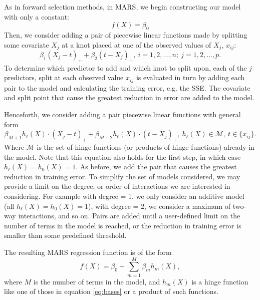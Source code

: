 \documentclass[12pt]{article}
\begin{document}
As in forward selection methods, in MARS, we begin constructing our model with only a constant:
\begin{equation}
  f(X) = \beta_{0}
\end{equation}
Then, we consider adding a pair of piecewise linear functions made by splitting some covariate $X_{j}$ at a knot placed at one of the observed values of $X_{j}$, $x_{ij}$:
\begin{equation}
\beta_{1} (X_{j} - t)_{+} + \beta_{2}(t - X_{j})_{+}, \ i = 1, 2, \ldots, n; \ j = 1, 2, \ldots, p.
\end{equation}
To determine which predictor to add and which knot to split upon, each of the $j$ predictors, split at each observed value $x_{ij}$ is evaluated in turn by adding each pair to the model and calculating the training error, e.g. the SSE. The covariate and split point that cause the greatest reduction in error are added to the model.

Henceforth, we consider adding a pair piecewise linear functions with general form
%
\begin{equation} \label{eq:gen-pairs-add}
  \beta_{M + 1} h_{\ell}(X) \cdot (X_{j} - t)_{+} + \beta_{M + 2} h_{\ell}(X) \cdot (t - X_{j})_{+}, \ h_{\ell}(X) \in \mathcal{M}, \ t \in \{x_{ij}\}.
\end{equation}
%
Where $\mathcal{M}$ is the set of hinge functions (or products of hinge functions) already in the model. Note that this equation also holds for the first step, in which case $h_{\ell}(X) = h_{0}(X) = 1$. As before, we add the pair that causes the greatest reduction in training error. To simplify the set of models considered, we may provide a limit on the degree, or order of interactions we are interested in considering. For example with degree = 1, we only consider an additive model (all $h_{\ell}(X) = h_{0}(X) = 1$), with degree = 2, we consider a maximum of two-way interactions, and so on.
Pairs are added until a user-defined limit on the number of terms in the model is reached, or the reduction in training error is smaller than some predefined threshold.

The resulting MARS regression function is of the form
\begin{equation}
  f(X) = \beta_{0} + \sum_{m = 1}^{M} \beta_{m} h_{m}(X),
\end{equation}
where $M$ is the number of terms in the model, and $h_{m}(X)$ is a hinge function like one of those in equation \ref{eq:bases} or a product of such functions.

\end{document}

